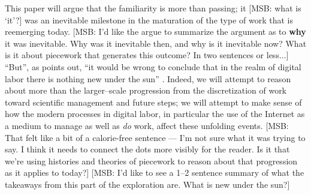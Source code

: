 \documentclass{sigchi}
\newcommand{\msb}[1]{{\color{PineGreen}[MSB: #1]}}
\begin{document}
This paper will argue that the familiarity is more than passing;
it \msb{what is `it'?} was an inevitable milestone in the maturation of the type of work that is reemerging today.
\msb{I'd like the argue to summarize the argument as to \textbf{why} it was inevitable. Why was it inevitable then, and why is it inevitable now? What is it about piecework that generates this outcome? In two sentences or less...}
``But'',
as \citeauthor{scholz2012digital} points out,
``it would be wrong to conclude that
in the realm of digital labor there is nothing new under the sun''
\cite{scholz2012digital}.
Indeed, we will attempt to reason about more than the larger--scale progression from
the discretization of work toward scientific management and future steps;
we will attempt to make sense of how the modern processes in digital labor,
in particular the use of the Internet as a medium to manage as well as \textit{do} work,
affect these unfolding events.
\msb{That felt like a bit of a calorie-free sentence --- I'm not sure what it was trying to say. I think it needs to connect the dots more visibly for the reader. Is it that we're using histories and theories of piecework to reason about that progression as it applies to today?}
\msb{I'd like to see a 1--2 sentence summary of what the takeaways from this part of the exploration are. What is new under the sun?}




\end{document}
